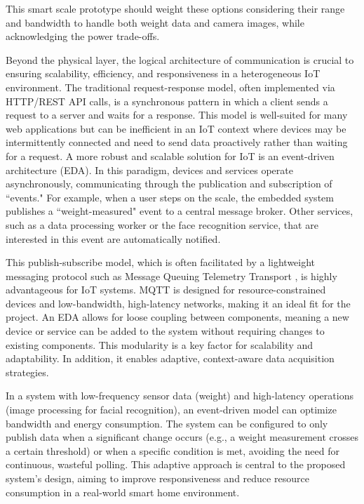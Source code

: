 \documentclass[12pt]{article}
\begin{document}
This smart scale prototype should weight these options considering their range and bandwidth to handle both weight data and camera images, while acknowledging the power trade-offs.

Beyond the physical layer, the logical architecture of communication is crucial to ensuring scalability, efficiency, and responsiveness in a heterogeneous IoT environment. The traditional request-response model, often implemented via HTTP/REST API calls, is a synchronous pattern in which a client sends a request to a server and waits for a response. This model is well-suited for many web applications but can be inefficient in an IoT context where devices may be intermittently connected and need to send data proactively rather than waiting for a request. A more robust and scalable solution for IoT is an event-driven architecture (EDA). In this paradigm, devices and services operate asynchronously, communicating through the publication and subscription of ``events." For example, when a user steps on the scale, the embedded system publishes a ``weight-measured" event to a central message broker. Other services, such as a data processing worker or the face recognition service, that are interested in this event are automatically notified.

This publish-subscribe model, which is often facilitated by a lightweight messaging protocol such as Message Queuing Telemetry Transport \cite{mqtt}, is highly advantageous for IoT systems. MQTT is designed for resource-constrained devices and low-bandwidth, high-latency networks, making it an ideal fit for the project. An EDA allows for loose coupling between components, meaning a new device or service can be added to the system without requiring changes to existing components. This modularity is a key factor for scalability and adaptability. In addition, it enables adaptive, context-aware data acquisition strategies. 

In a system with low-frequency sensor data (weight) and high-latency operations (image processing for facial recognition), an event-driven model can optimize bandwidth and energy consumption. The system can be configured to only publish data when a significant change occurs (e.g., a weight measurement crosses a certain threshold) or when a specific condition is met, avoiding the need for continuous, wasteful polling. This adaptive approach is central to the proposed system's design, aiming to improve responsiveness and reduce resource consumption in a real-world smart home environment.
\end{document}
